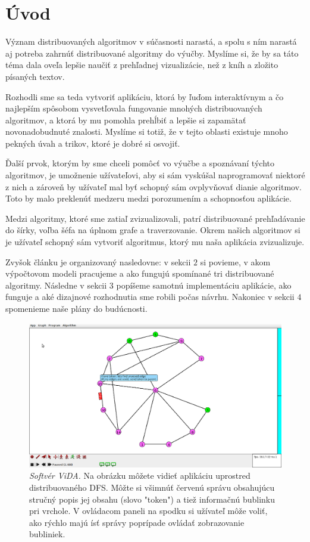 \section{Úvod}

Význam distribuovaných algoritmov v súčasnosti narastá, a spolu s ním narastá aj potreba
zahrnúť distribuované algoritmy do výučby. Myslíme si, že by sa táto téma dala oveľa lepšie naučiť
z prehľadnej vizualizácie, než z kníh a zložito písaných textov.

Rozhodli sme sa teda vytvoriť aplikáciu, ktorá by ľuďom interaktívnym a čo najlepším spôsobom
vysvetľovala fungovanie mnohých distribuovaných algoritmov, a ktorá by mu pomohla prehĺbiť a lepšie si zapamätať
novonadobudnuté znalosti. Myslíme si totiž, že v tejto oblasti existuje mnoho pekných úvah a trikov,
ktoré je dobré si osvojiť. 

Ďalší prvok, ktorým by sme chceli pomôcť vo výučbe a spoznávaní týchto algoritmov, je umožnenie užívateľovi, 
aby si sám vyskúšal naprogramovať niektoré z nich a zároveň by užívateľ mal byť schopný sám
ovplyvňovať dianie algoritmov. Toto by malo preklenúť medzeru medzi porozumením a schopnosťou
aplikácie.

Medzi algoritmy, ktoré sme zatiaľ zvizualizovali, patrí distribuované prehľadávanie do šírky,
voľba šéfa na úplnom grafe a traverzovanie. Okrem našich algoritmov si je užívateľ schopný
sám vytvoriť algoritmus, ktorý mu naša aplikácia zvizualizuje.

Zvyšok článku je organizovaný nasledovne: v sekcii $2$ si povieme, v akom výpočtovom modeli
pracujeme a ako fungujú spomínané tri distribuované algoritmy. 
Následne v sekcii $3$ popíšeme samotnú implementáciu aplikácie, ako
funguje a aké dizajnové rozhodnutia sme robili počas návrhu. Nakoniec v sekcii $4$ spomenieme naše plány do budúcnosti.

\noindent
\begin{figure}
\centering
\includegraphics[width=2.01\columnwidth]{DFS.png}
\caption{\emph{Softvér ViDA.} Na obrázku môžete vidieť aplikáciu uprostred distribuovaného DFS. Môžte
si všimnúť červenú správu obsahujúcu stručný popis jej obsahu (slovo "token") a tiež informačnú
bublinku pri vrchole. V ovládacom paneli na spodku si užívateľ môže voliť, ako rýchlo majú ísť
správy poprípade ovládať zobrazovanie bubliniek.}
\label{img:historia} 
\end{figure}
